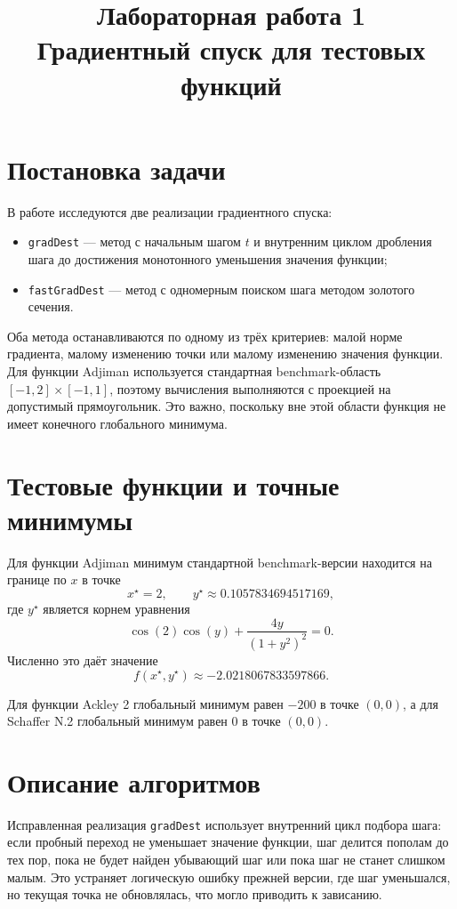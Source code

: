 \documentclass[12pt,a4paper]{article}
\title{Лабораторная работа 1\\Градиентный спуск для тестовых функций}
\author{}
\date{}
\begin{document}
\maketitle

\section{Постановка задачи}
В работе исследуются две реализации градиентного спуска:
\begin{itemize}
\item \texttt{gradDest} --- метод с начальным шагом $t$ и внутренним циклом дробления шага до достижения монотонного уменьшения значения функции;
\item \texttt{fastGradDest} --- метод с одномерным поиском шага методом золотого сечения.
\end{itemize}

Оба метода останавливаются по одному из трёх критериев: малой норме градиента, малому изменению точки или малому изменению значения функции. Для функции Adjiman используется стандартная benchmark-область $[-1, 2] \times [-1, 1]$, поэтому вычисления выполняются с проекцией на допустимый прямоугольник. Это важно, поскольку вне этой области функция не имеет конечного глобального минимума.

\section{Тестовые функции и точные минимумы}


Для функции Adjiman минимум стандартной benchmark-версии находится на границе по $x$ в точке
\[
x^\star = 2, \qquad
y^\star \approx 0.1057834694517169,
\]
где $y^\star$ является корнем уравнения
\[
\cos(2)\cos(y) + \frac{4y}{(1+y^2)^2} = 0.
\]
Численно это даёт значение
\[
f(x^\star, y^\star) \approx -2.0218067833597866.
\]

Для функции Ackley 2 глобальный минимум равен $-200$ в точке $(0,0)$, а для Schaffer N.2 глобальный минимум равен $0$ в точке $(0,0)$.

\section{Описание алгоритмов}
Исправленная реализация \texttt{gradDest} использует внутренний цикл подбора шага: если пробный переход не уменьшает значение функции, шаг делится пополам до тех пор, пока не будет найден убывающий шаг или пока шаг не станет слишком малым. Это устраняет логическую ошибку прежней версии, где шаг уменьшался, но текущая точка не обновлялась, что могло приводить к зависанию.
\end{document}
